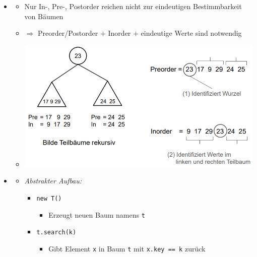 \documentclass[
    12pt,
    a4paper,
    ngerman,
    color=3b,%
    marginpar=false,
    colorback=false,
    leqno,
]{tudaexercise}
\begin{document}
\begin{itemize}
\begin{itemize}
\begin{minipage}[t]{0.31\textwidth}
                    \end{minipage}
          \end{itemize}
          \clearpage
    \item {}
          \begin{itemize}
              \item Nur In-, Pre-, Postorder reichen nicht zur eindeutigen Bestimmbarkeit von Bäumen
              \item[] $\Rightarrow$ Preorder/Postorder $+$ Inorder $+$ eindeutige Werte sind notwendig
              \item[] \includegraphics[width=12cm]{pictures/bestimmbarkeitBaum.PNG}
          \end{itemize}


    \item {}
          \begin{itemize}
              \item \textit{Abstrakter Aufbau:}
                    \begin{itemize}
                        \item \texttt{new T()}
                              \begin{itemize}
                                  \item Erzeugt neuen Baum namens \texttt{t}
                              \end{itemize}

                        \item \texttt{t.search(k)}
                              \begin{itemize}
                                  \item Gibt Element \texttt{x} in Baum \texttt{t} mit \texttt{x.key == k} zurück
                              \end{itemize}


\end{itemize}
\end{itemize}
\end{itemize}
\end{document}
